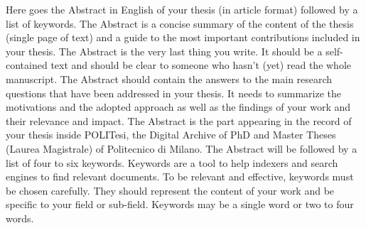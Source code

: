 


Here goes the Abstract in English of your thesis (in article format)
followed by a list of keywords.
The Abstract is a concise summary of the content of the thesis (single page of text)
and a guide to the most important contributions included in your thesis.
The Abstract is the very last thing you write.
It should be a self-contained text and should be clear
to someone who hasn't (yet) read the whole manuscript.
The Abstract should contain the answers to the main research questions
that have been addressed in your thesis.
It needs to summarize the motivations and the adopted approach as well as
the findings of your work and their relevance and impact.
The Abstract is the part appearing in the record of your thesis inside POLITesi,
the Digital Archive of PhD and Master Theses (Laurea Magistrale) of Politecnico di Milano.
The Abstract will be followed by a list of four to six keywords.
Keywords are a tool to help indexers and search engines to find relevant documents.
To be relevant and effective, keywords must be chosen carefully.
They should represent the content of your work and be specific to your field or sub-field.
Keywords may be a single word or two to four words. 